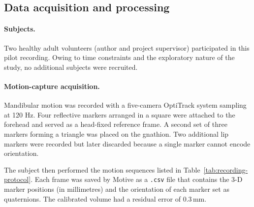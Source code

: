 \subsection{Data acquisition and processing}

\paragraph{Subjects.} 
Two healthy adult volunteers (author and project supervisor) participated in this pilot recording. Owing to time constraints and the exploratory 
nature of the study, no additional subjects were recruited.

\paragraph{Motion-capture acquisition.}
Mandibular motion was recorded with a five-camera OptiTrack system sampling at 120 Hz.
Four reflective markers arranged in a square were attached to the forehead and served as a head-fixed reference frame.
A second set of three markers forming a triangle was placed on the gnathion.
Two additional lip markers were recorded but later discarded because a single marker cannot encode orientation. \cite{motion_capture_adult,motion_capture_children}

The subject then performed the motion sequences listed in Table~\ref{tab:recording-protocol}. Each frame was saved by Motive as a \texttt{.csv} file that contains
the 3-D marker positions (in millimetres) and the orientation of each marker set as quaternions. The calibrated volume had a residual error of $0.3\,$mm.

